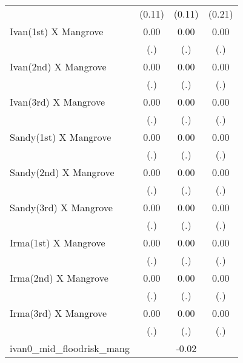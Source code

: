 {\begin{tabular}{l*{3}{c}}
                    &      (0.11)         &      (0.11)         &      (0.21)         \\
[1em]
Ivan(1st) X Mangrove&        0.00         &        0.00         &        0.00         \\
                    &         (.)         &         (.)         &         (.)         \\
[1em]
Ivan(2nd) X Mangrove&        0.00         &        0.00         &        0.00         \\
                    &         (.)         &         (.)         &         (.)         \\
[1em]
Ivan(3rd) X Mangrove&        0.00         &        0.00         &        0.00         \\
                    &         (.)         &         (.)         &         (.)         \\
[1em]
Sandy(1st) X Mangrove&        0.00         &        0.00         &        0.00         \\
                    &         (.)         &         (.)         &         (.)         \\
[1em]
Sandy(2nd) X Mangrove&        0.00         &        0.00         &        0.00         \\
                    &         (.)         &         (.)         &         (.)         \\
[1em]
Sandy(3rd) X Mangrove&        0.00         &        0.00         &        0.00         \\
                    &         (.)         &         (.)         &         (.)         \\
[1em]
Irma(1st) X Mangrove&        0.00         &        0.00         &        0.00         \\
                    &         (.)         &         (.)         &         (.)         \\
[1em]
Irma(2nd) X Mangrove&        0.00         &        0.00         &        0.00         \\
                    &         (.)         &         (.)         &         (.)         \\
[1em]
Irma(3rd) X Mangrove&        0.00         &        0.00         &        0.00         \\
                    &         (.)         &         (.)         &         (.)         \\
[1em]
ivan0\_mid\_floodrisk\_mang&                     &       -0.02\sym{***}&                     \\

\end{tabular}}
